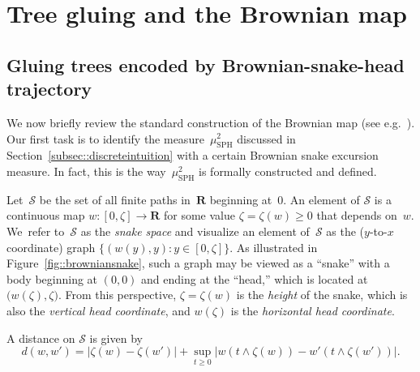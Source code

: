 \documentclass[10pt]{amsart}
\let\mathcal\mathscr
\let\oldS\S
\theoremstyle{plain}
\numberwithin{theorem}{section}
\theoremstyle{definition}
\newcommand{\snake}{{\mathcal S}}
\newcommand{\R}{\mathbf{R}}
\renewcommand{\S}{{\mathbf S}}
\newcommand{\mustwo}{\mu_{\mathrm{SPH}}^2}
\begin{document}
\section{Tree gluing and the Brownian map}
\label{sec::brownianmap}

\subsection{Gluing trees encoded by Brownian-snake-head trajectory}
\label{subsec::spheresassymetric}

We now briefly review the standard construction of the Brownian map (see e.g.\ \cite[\oldS 3.4]{legall2014icm}). Our first task is to identify the measure~$\mustwo$ discussed in Section~\ref{subsec::discreteintuition} with a certain Brownian snake excursion measure. In fact, this is the way~$\mustwo$ is formally constructed and defined.

Let~$\snake$ be the set of all finite paths in~$\R$ beginning at~$0$. An element of $\snake$ is a continuous map $w \colon [0, \zeta] \to \R$ for some value $\zeta = \zeta(w) \geq 0$ that depends on~$w$. We~refer to~$\snake$ as the \emph{snake space} and visualize an element of~$\snake$ as the ($y$-to-$x$ coordinate) graph $\{ (w(y), y): y \in [0,\zeta] \}$. As illustrated in Figure~\ref{fig::browniansnake}, such a graph may be viewed as a ``snake'' with a body beginning at $(0,0)$ and ending at the ``head,'' which is located at $\bigl(w(\zeta), \zeta \bigr)$. From this perspective, $\zeta = \zeta(w)$ is the \emph{height} of the snake, which is also the \emph{vertical head coordinate}, and $w(\zeta)$ is the \emph{horizontal head coordinate}.

A distance on $\snake$ is given by
\begin{equation}
\label{eqn::snake_metric}
d(w,w') = |\zeta(w) - \zeta(w')| + \sup_{t \geq 0} | w(t \wedge \zeta(w)) - w'(t \wedge \zeta(w'))|.
\end{equation}
\end{document}
